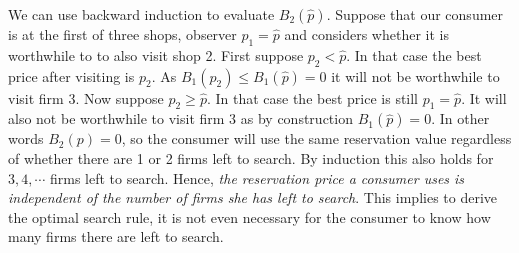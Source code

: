 We can use backward induction to evaluate $B_2(\hat p)$. Suppose that our
consumer is at the first of three shops, observer $p_1=\hat p$ and
considers whether it is worthwhile to to also visit shop 2. First suppose
$p_2<\hat p$. In that case the best price after visiting is $p_2$. As
$B_1(p_2)\leq B_1(\hat p)=0$ it will not be worthwhile to visit firm 3.
Now suppose $p_2\geq\hat p$. In that case the best price is still
$p_1=\hat p$. It will also not be worthwhile to visit firm 3 as by
construction $B_1(\hat p)=0$. In other words $B_2(p)=0$, so the
consumer will use the same reservation value regardless of whether there
are 1 or 2 firms left to search. By induction this also holds for
$3,4,\cdots$ firms left to search. Hence, \textit{the reservation price a
	consumer uses is independent of the number of firms she has left to
	search}. This implies to derive the optimal search rule, it is
not even necessary for the consumer to know how many firms there are left
to search.
